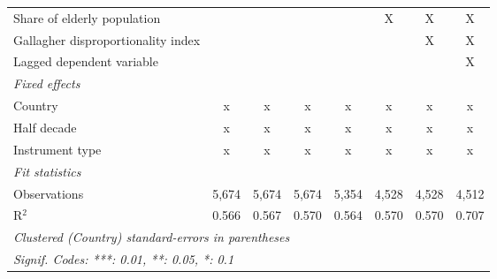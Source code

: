\begin{tabular}{lccccccc}
   Share of elderly population                                                             &              &         &               &             & X            & X           & X\\  
   Gallagher disproportionality index                                                      &              &         &               &             &              & X           & X\\  
   Lagged dependent variable                                                               &              &         &               &             &              &             & X\\  
   \emph{Fixed effects}\\
   Country                                                                                 & x            & x       & x             & x           & x            & x           & x\\  
   Half decade                                                                             & x            & x       & x             & x           & x            & x           & x\\  
   Instrument type                                                                         & x            & x       & x             & x           & x            & x           & x\\  
   \midrule \emph{Fit statistics}\\
   Observations                                                                            & 5,674        & 5,674   & 5,674         & 5,354       & 4,528        & 4,528       & 4,512\\  
   R$^2$                                                                                   & 0.566        & 0.567   & 0.570         & 0.564       & 0.570        & 0.570       & 0.707\\  
   \midrule
   \multicolumn{8}{l}{\emph{Clustered (Country) standard-errors in parentheses}}\\
   \multicolumn{8}{l}{\emph{Signif. Codes: ***: 0.01, **: 0.05, *: 0.1}}\\
\end{tabular}
\par\endgroup


